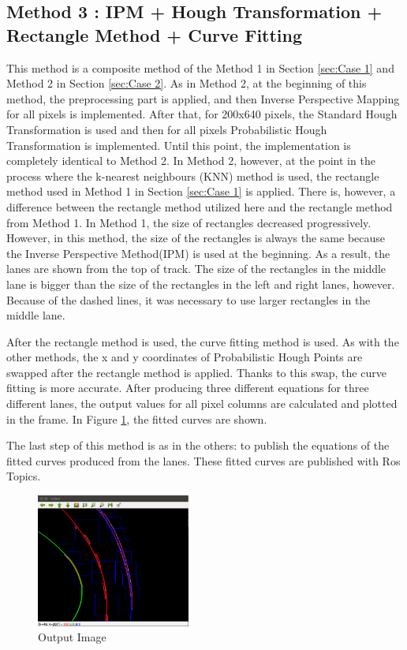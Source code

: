 \subsection{Method 3 : IPM + Hough Transformation + Rectangle Method + Curve Fitting}\label{sec:Case 3}

This method is a composite method of the Method 1 in Section \ref{sec:Case 1} and Method 2 in Section \ref{sec:Case 2}. As in Method 2, at the beginning of this method, the preprocessing part is applied, and then Inverse Perspective Mapping for all pixels is implemented. After that, for 200x640 pixels, the Standard Hough Transformation is used and then for all pixels Probabilistic Hough Transformation is implemented. Until this point, the implementation is completely identical to Method 2. In Method 2, however, at the point in the process where the k-nearest neighbours (KNN) method is used, the rectangle method used in Method 1 in Section \ref{sec:Case 1} is applied. There is, however, a difference between the rectangle method utilized here and the rectangle method from Method 1. In Method 1, the size of rectangles decreased progressively. However, in this method, the size of the rectangles is always the same because the Inverse Perspective Method(IPM) is used at the beginning. As a result, the lanes are shown from the top of track. The size of the rectangles in the middle lane is bigger than the size of the rectangles in the left and right lanes, however. Because of the dashed lines, it was necessary to use larger rectangles in the middle lane.

After the rectangle method is used, the curve fitting method is used. As with the other methods, the x and y coordinates of Probabilistic Hough Points are swapped after the rectangle method is applied. Thanks to this swap, the curve fitting is more accurate. After producing three different equations for three different lanes, the output values for all pixel columns are calculated and plotted in the frame. In Figure \ref{fig:Case3_OutputImage}, the fitted curves are shown.

The last step of this method is as in the others: to publish the equations of the fitted curves produced from the lanes. These fitted curves are published with Ros Topics.

\begin{figure}[H]
 \centering
  \includegraphics[width=0.45\textwidth]{./Bilder/Case3_OutputImage.png}
	\caption{Output Image}
	\label{fig:Case3_OutputImage}
\end{figure}











%


